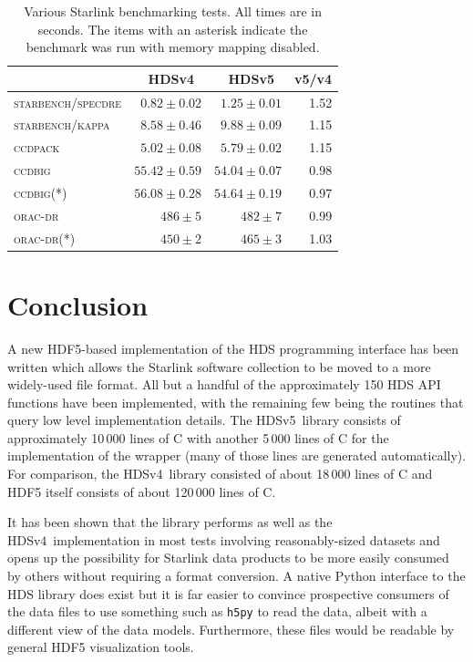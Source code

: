 \documentclass[final,authoryear,5p,times,twocolumn]{elsarticle}
\newcommand{\new}{HDSv5}
\newcommand{\old}{HDSv4}
\begin{document}
\begin{table}
\caption{Various Starlink benchmarking tests. All times are in
  seconds. The items with an asterisk indicate the benchmark was run
  with memory mapping disabled.}
\label{tab:bench}
\begin{center}
\begin{tabular}{lrrr}
\hline
   & \old\ & \new\ & v5/v4 \\ \hline
\textsc{starbench/specdre} & $0.82\pm0.02$ & $1.25\pm0.01$ & 1.52\\
\textsc{starbench/kappa} & $8.58\pm0.46$ & $9.88\pm0.09$ & 1.15\\
\textsc{ccdpack} & $5.02\pm0.08$ & $5.79\pm0.02$ & 1.15\\
\textsc{ccdbig} & $55.42\pm0.59$ & $54.04\pm0.07$ & 0.98\\
\textsc{ccdbig}(*) & $56.08\pm0.28$ & $54.64\pm0.19$ & 0.97\\
\textsc{orac-dr} & $486\pm5$ & $482\pm7$ & 0.99\\
\textsc{orac-dr}(*) & $450\pm2$ & $465\pm3$ & 1.03\\
\hline
\end{tabular}
\end{center}
\end{table}




\section{Conclusion}

A new HDF5-based implementation of the HDS programming interface has
been written which allows the Starlink software collection to be moved
to a more widely-used file format. All but a handful of the
approximately 150 HDS API functions have been implemented, with the
remaining few being the routines that query low level implementation
details. The \new\ library consists of approximately 10\,000 lines of
C with another 5\,000 lines of C for the implementation of the wrapper
(many of those lines are generated automatically). For comparison, the
\old\ library consisted of about 18\,000 lines of C and HDF5 itself
consists of about 120\,000 lines of C.

It has been shown that the library performs as well as the \old\
implementation in most tests involving reasonably-sized datasets and
opens up the possibility for Starlink data products to be more easily
consumed by others without requiring a format conversion. A native
Python interface to the HDS library does exist but it is far easier to
convince prospective consumers of the data files to use something
such as \texttt{h5py} \citep[e.g.,][]{pyhdf5} to read the data, albeit
with a different view of the data models. Furthermore, these files
would be readable by general HDF5 visualization tools.
\end{document}
